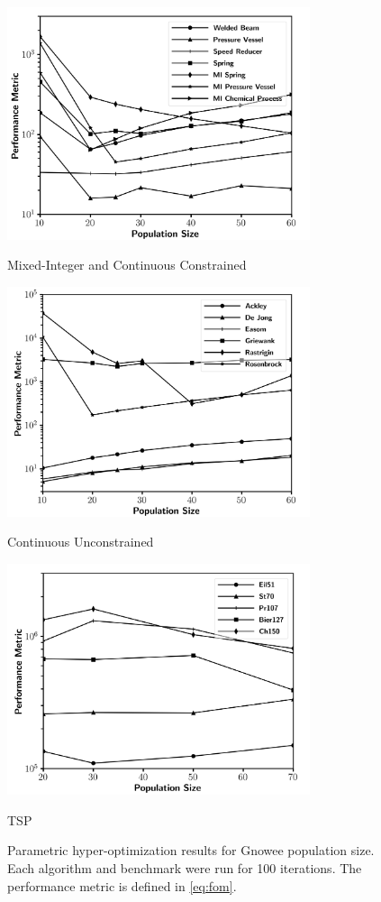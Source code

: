 \documentclass{article}                                                                           %
\begin{document}
\begin{figure}[!t]
\centering
{\includegraphics[width=3.5in]{population_MI_Constr}%
\label{p_MI_Constr}
\caption*{Mixed-Integer and Continuous Constrained}}
{\includegraphics[width=3.5in]{population_MI_Unconstr}%
\label{p_MI_UnConstr}
\caption*{Continuous Unconstrained}}
{\includegraphics[width=3.5in]{population_Comb}%
\label{p_Comb}
\caption*{TSP}}
\caption{Parametric hyper-optimization results for Gnowee population size. Each algorithm and benchmark were run for 100 iterations.  The performance metric is defined in \autoref{eq:fom}.}
\label{fig:p_hyper}
\end{figure}
\end{document}
